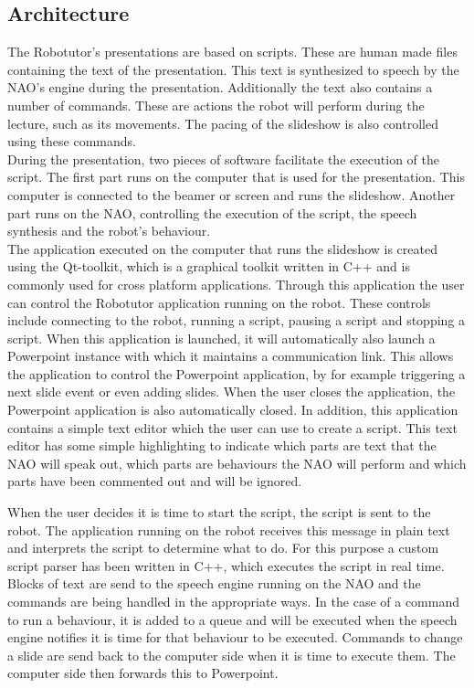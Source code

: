 \subsection{Architecture}
The Robotutor's presentations are based on scripts. These are human made files containing the text of the presentation. This text is synthesized to speech by the NAO's engine during the presentation. Additionally the text also contains a number of commands. These are actions the robot will perform during the lecture, such as its movements. The pacing of the slideshow is also controlled using these commands.\\
During the presentation, two pieces of software facilitate the execution of the script. The first part runs on the computer that is used for the presentation. This computer is connected to the beamer or screen and runs the slideshow. Another part runs on the NAO, controlling the execution of the script, the speech synthesis and the robot's behaviour.\\

The application executed on the computer that runs the slideshow is created using the Qt-toolkit, which is a graphical toolkit written in C++ and is commonly used for cross platform applications. Through this application the user can control the Robotutor application running on the robot. These controls include connecting to the robot, running a script, pausing a script and stopping a script. When this application is launched, it will automatically also launch a Powerpoint instance with which it maintains a communication link. This allows the application to control the Powerpoint application, by for example triggering a next slide event or even adding slides. When the user closes the application, the Powerpoint application is also automatically closed. In addition, this application contains a simple text editor which the user can use to create a script. This text editor has some simple highlighting to indicate which parts are text that the NAO will speak out, which parts are behaviours the NAO will perform and which parts have been commented out and will be ignored.\

When the user decides it is time to start the script, the script is sent to the robot. The application running on the robot receives this message in plain text and interprets the script to determine what to do. For this purpose a custom script parser has been written in C++, which executes the script in real time. Blocks of text are send to the speech engine running on the NAO and the commands are being handled in the appropriate ways. In the case of a command to run a behaviour, it is added to a queue and will be executed when the speech engine notifies it is time for that behaviour to be executed. Commands to change a slide are send back to the computer side when it is time to execute them. The computer side then forwards this to Powerpoint.\

